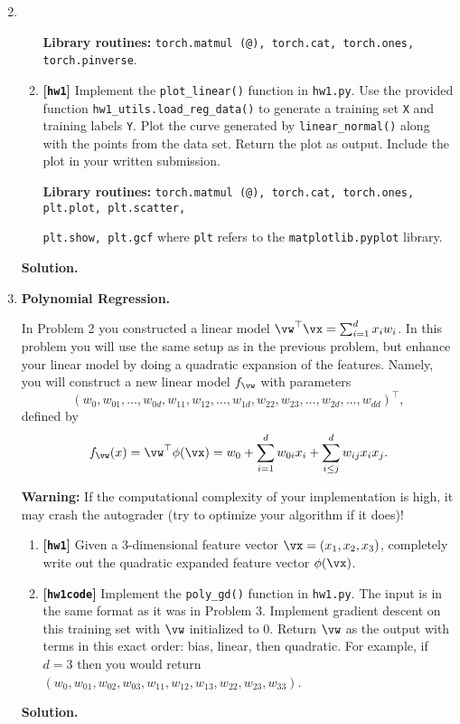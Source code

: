 \documentclass{article}
\def\hw{\textbf{[\texttt{hw1}]}\xspace}
\def\hwcode{\textbf{[\texttt{hw1code}]}\xspace}
\theoremstyle{definition}
\theoremstyle{remark}
\newenvironment{Q}
{%
  \clearpage
  \item
  }
  {%
    \phantom{s} %
    \bigskip
    \textbf{Solution.}
  }
\begin{document}
\begin{enumerate}[font={\Large\bfseries},left=0pt]
\begin{Q}
\begin{enumerate}
          \textbf{Library routines:} \texttt{torch.matmul (@), torch.cat, torch.ones, torch.pinverse}.

        \item \hw Implement the \texttt{plot\_linear()} function in \texttt{hw1.py}.  Use the provided function \texttt{hw1\_utils.load\_reg\_data()} to generate a training set \texttt{X} and training labels \texttt{Y}. Plot the curve generated by \texttt{linear\_normal()} along with the points from the data set.  Return the plot as output.  Include the plot in your written submission.

          \textbf{Library routines:} \texttt{torch.matmul (@), torch.cat, torch.ones, plt.plot, plt.scatter,}

          \texttt{plt.show, plt.gcf} where \texttt{plt} refers to the \texttt{matplotlib.pyplot} library.
      \end{enumerate}
    \end{Q}

    \begin{Q}
  \textbf{\Large Polynomial Regression.}

  In Problem 2 you constructed a linear model $\vw^\top \vx = \sum_{i=1}^d x_i w_i$.  In this problem you will use the same setup as in the previous problem, but enhance your linear model by doing a quadratic expansion of the features.  Namely, you will construct a new linear model $f_{\vw}$ with parameters
  \[
    (w_{0}, w_{01},\dots,w_{0d},w_{11}, w_{12},\dots,w_{1d},w_{22}, w_{23},\dots,w_{2d},\dots, w_{dd})^\top,
  \]
    defined by
  	\begin{align*}
  	f_{\vw}(x) = \vw^\top \phi(\vx) = w_0 + \sum_{i=1}^d w_{0i} x_i + \sum_{i\leq j}^dw_{ij} x_ix_j.
  	\end{align*}
  	
  \textbf{Warning:} If the computational complexity of your implementation is high, it may crash the autograder (try to optimize your algorithm if it does)!
  \begin{enumerate}
  \item \hw Given a $3$-dimensional feature vector $\vx = (x_1,x_2,x_3)$, completely write out the quadratic expanded feature vector $\phi(\vx)$.
  \item \hwcode Implement the \texttt{poly\_gd()} function in \texttt{hw1.py}.  The input is in the same format as it was in Problem 3.  Implement gradient descent on this training set with $\vw$ initialized to 0.  Return $\vw$ as the output with terms in this exact order: bias, linear, then quadratic.  For example, if $d = 3$ then you would return $(w_0, w_{01},w_{02},w_{03},w_{11},w_{12},w_{13},w_{22},w_{23},w_{33})$.
  

\end{enumerate}
\end{Q}
\end{enumerate}
\end{document}
